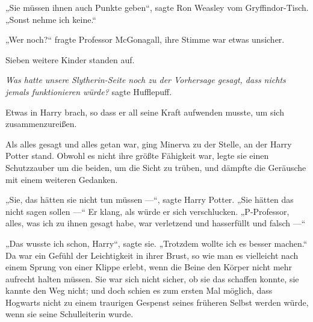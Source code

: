 „Sie müssen ihnen auch Punkte geben“, sagte Ron Weasley vom Gryffindor-Tisch.
„Sonst nehme ich keine.“

„Wer noch?“ fragte Professor McGonagall, ihre Stimme war etwas unsicher.

Sieben weitere Kinder standen auf.

\emph{Was hatte unsere Slytherin-Seite noch zu der Vorhersage gesagt, dass nichts jemals funktionieren würde?} sagte Hufflepuff.

Etwas in Harry brach, so dass er all seine Kraft aufwenden musste, um sich zusammenzureißen.

\later

Als alles gesagt und alles getan war, ging Minerva zu der Stelle, an der Harry Potter stand. Obwohl es nicht ihre größte Fähigkeit war, legte sie einen Schutzzauber um die beiden, um die Sicht zu trüben, und dämpfte die Geräusche mit einem weiteren Gedanken.

„Sie, das hätten sie nicht tun müssen —“, sagte Harry Potter.
„Sie hätten das nicht sagen sollen —“ Er klang, als würde er sich verschlucken.
„P-Professor, alles, was ich zu ihnen gesagt habe, war verletzend und hasserfüllt und falsch —“

„Das wusste ich schon, Harry“, sagte sie.
„Trotzdem wollte ich es besser machen.“ Da war ein Gefühl der Leichtigkeit in ihrer Brust, so wie man es vielleicht nach einem Sprung von einer Klippe erlebt, wenn die Beine den Körper nicht mehr aufrecht halten müssen. Sie war sich nicht sicher, ob sie das schaffen konnte, sie kannte den Weg nicht; und doch schien es zum ersten Mal möglich, dass Hogwarts nicht zu einem traurigen Gespenst seines früheren Selbst werden würde, wenn sie seine Schulleiterin wurde.

